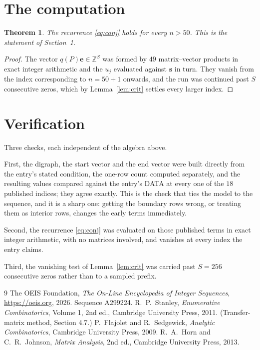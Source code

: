 \documentclass[11pt,a4paper]{article}
\theoremstyle{plain}
\newtheorem{theorem}{Theorem}
\theoremstyle{definition}
\begin{document}
\section{The computation}

\begin{theorem}
The recurrence \eqref{eq:conj} holds for every $n>50$. This is the statement of
Section~1.
\end{theorem}

\begin{proof}
The vector $q(P)\mathbf{e}\in\mathbb{Z}^{S}$ was formed by $49$ matrix--vector
products in exact integer arithmetic and the $u_j$ evaluated against $\mathbf{s}$ in turn.
They vanish from the index corresponding to $n=50+1$ onwards, and the run was continued
past $S$ consecutive zeros, which by Lemma~\ref{lem:crit} settles every larger index.
\end{proof}

\section{Verification}

Three checks, each independent of the algebra above.

First, the digraph, the start vector and the end vector were built directly from the
entry's stated condition, the one-row count computed separately, and the resulting values
compared against the entry's DATA at every one of the $18$ published indices; they
agree exactly. This is the check that ties the model to the sequence, and it is a sharp one:
getting the boundary rows wrong, or treating them as interior rows, changes the early terms
immediately.

Second, the recurrence \eqref{eq:conj} was evaluated on those published terms in exact
integer arithmetic, with no matrices involved, and vanishes at every index the entry claims.

Third, the vanishing test of Lemma~\ref{lem:crit} was carried past $S=256$ consecutive
zeros rather than to a sampled prefix.

\begin{thebibliography}{9}
 The OEIS Foundation, \emph{The On-Line Encyclopedia of Integer
Sequences}, \url{https://oeis.org}, 2026. Sequence A299224.
 R.~P.~Stanley, \emph{Enumerative Combinatorics}, Volume 1, 2nd ed.,
Cambridge University Press, 2011. (Transfer-matrix method, Section 4.7.)
 P.~Flajolet and R.~Sedgewick, \emph{Analytic Combinatorics}, Cambridge
University Press, 2009.
 R.~A.~Horn and C.~R.~Johnson, \emph{Matrix Analysis}, 2nd ed., Cambridge
University Press, 2013.
\end{thebibliography}
\end{document}
